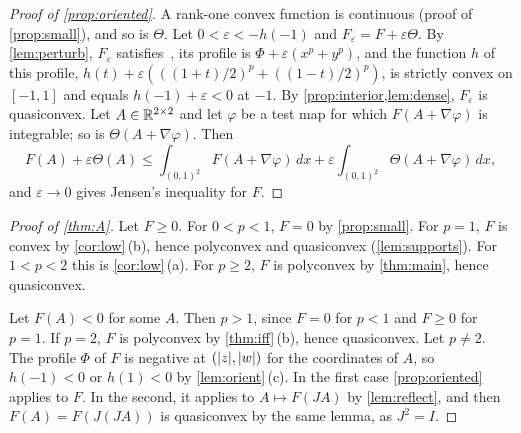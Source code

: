 \begin{proof}[Proof of \cref{prop:oriented}]
A rank-one convex function is continuous (proof of \cref{prop:small}), and so is $\Theta$. Let
$0<\varepsilon<-h(-1)$ and $F_\varepsilon=F+\varepsilon\Theta$. By \cref{lem:perturb},
$F_\varepsilon$ satisfies~\Hyp, its profile is $\Phi+\varepsilon(x^p+y^p)$, and the function $h$
of this profile, $h(t)+\varepsilon(((1+t)/2)^p+((1-t)/2)^p)$, is strictly convex on $[-1,1]$
and equals $h(-1)+\varepsilon<0$ at $-1$. By \cref{prop:interior,lem:dense}, $F_\varepsilon$ is
quasiconvex. Let $A\in\mathbb{R}^{2\times 2}$ and let $\varphi$ be a test map for which $F(A+\nabla\varphi)$ is
integrable; so is $\Theta(A+\nabla\varphi)$. Then
\[
  F(A)+\varepsilon\Theta(A)\le\int_{(0,1)^2}F(A+\nabla\varphi)\,dx
  +\varepsilon\int_{(0,1)^2}\Theta(A+\nabla\varphi)\,dx,
\]
and $\varepsilon\to0$ gives Jensen's inequality for $F$.
\end{proof}

\begin{proof}[Proof of \cref{thm:A}]
Let $F\ge0$. For $0<p<1$, $F=0$ by \cref{prop:small}. For $p=1$, $F$ is convex by
\cref{cor:low}\,(b), hence polyconvex and quasiconvex (\cref{lem:supports}). For $1<p<2$ this is
\cref{cor:low}\,(a). For $p\ge2$, $F$ is polyconvex by \cref{thm:main}, hence quasiconvex.

Let $F(A)<0$ for some $A$. Then $p>1$, since $F=0$ for $p<1$ and $F\ge0$ for $p=1$. If $p=2$,
$F$ is polyconvex by \cref{thm:iff}\,(b), hence quasiconvex. Let $p\ne2$. The profile $\Phi$ of
$F$ is negative at $(\lvert z\rvert,\lvert w\rvert)$ for the coordinates of $A$, so $h(-1)<0$ or $h(1)<0$ by
\cref{lem:orient}\,(c). In the first case \cref{prop:oriented} applies to $F$. In the second, it
applies to $A\mapsto F(JA)$ by \cref{lem:reflect}, and then $F(A)=F(J(JA))$ is quasiconvex by
the same lemma, as $J^2=I$.
\end{proof}
